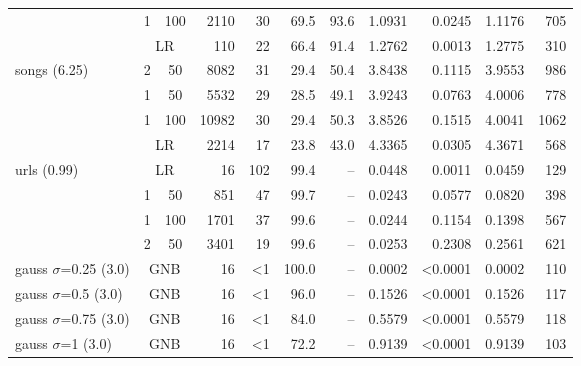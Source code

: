 \begin{tabular}{l ccr rrrrrrr}
                                            &                 1 & 100 &  2110 &  30 &  69.5 & 93.6 & 1.0931 &  0.0245 & 1.1176 &  705 \\
                                            &  \multicolumn{2}{c}{LR} &   110 &  22 &  66.4 & 91.4 & 1.2762 &  0.0013 & 1.2775 &  310 \\
      \midrule\multirow{4}{*}{songs (6.25)} &                  2 & 50 &  8082 &  31 &  29.4 & 50.4 & 3.8438 &  0.1115 & 3.9553 &  986 \\
                                            &                  1 & 50 &  5532 &  29 &  28.5 & 49.1 & 3.9243 &  0.0763 & 4.0006 &  778 \\
                                            &                 1 & 100 & 10982 &  30 &  29.4 & 50.3 & 3.8526 &  0.1515 & 4.0041 & 1062 \\
                                            &  \multicolumn{2}{c}{LR} &  2214 &  17 &  23.8 & 43.0 & 4.3365 &  0.0305 & 4.3671 &  568 \\
       \midrule\multirow{4}{*}{urls (0.99)} &  \multicolumn{2}{c}{LR} &    16 & 102 &  99.4 &   -- & 0.0448 &  0.0011 & 0.0459 &  129 \\
                                            &                  1 & 50 &   851 &  47 &  99.7 &   -- & 0.0243 &  0.0577 & 0.0820 &  398 \\
                                            &                 1 & 100 &  1701 &  37 &  99.6 &   -- & 0.0244 &  0.1154 & 0.1398 &  567 \\
                                            &                  2 & 50 &  3401 &  19 &  99.6 &   -- & 0.0253 &  0.2308 & 0.2561 &  621 \\
         \midrule gauss $\sigma$=0.25 (3.0) & \multicolumn{2}{c}{GNB} &    16 &  <1 & 100.0 &   -- & 0.0002 & <0.0001 & 0.0002 &  110 \\
                   gauss $\sigma$=0.5 (3.0) & \multicolumn{2}{c}{GNB} &    16 &  <1 &  96.0 &   -- & 0.1526 & <0.0001 & 0.1526 &  117 \\
                  gauss $\sigma$=0.75 (3.0) & \multicolumn{2}{c}{GNB} &    16 &  <1 &  84.0 &   -- & 0.5579 & <0.0001 & 0.5579 &  118 \\
                     gauss $\sigma$=1 (3.0) & \multicolumn{2}{c}{GNB} &    16 &  <1 &  72.2 &   -- & 0.9139 & <0.0001 & 0.9139 &  103 \\

		\bottomrule

	\end{tabular}


